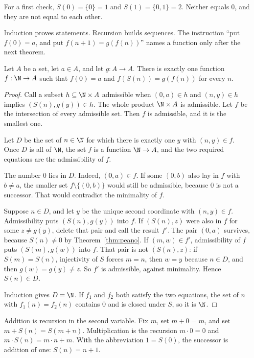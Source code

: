 For a first check, $S(0)=\{0\}=1$ and $S(1)=\{0,1\}=2$. Neither equals $0$, and they are not equal to each other.

Induction proves statements. Recursion builds sequences. The instruction ``put $f(0)=a$, and put $f(n+1)=g(f(n))$'' names a function only after the next theorem.

\begin{theorem}[recursion]\label{thm:recursion}
Let $A$ be a set, let $a\in A$, and let $g:A\to A$. There is exactly one function $f:\N\to A$ such that $f(0)=a$ and $f(S(n))=g(f(n))$ for every $n$.
\end{theorem}
\begin{proof}
Call a subset $h\subseteq\N\times A$ admissible when $(0,a)\in h$ and $(n,y)\in h$ implies $(S(n),g(y))\in h$. The whole product $\N\times A$ is admissible. Let $f$ be the intersection of every admissible set. Then $f$ is admissible, and it is the smallest one.

Let $D$ be the set of $n\in\N$ for which there is exactly one $y$ with $(n,y)\in f$. Once $D$ is all of $\N$, the set $f$ is a function $\N\to A$, and the two required equations are the admissibility of $f$.

The number $0$ lies in $D$. Indeed, $(0,a)\in f$. If some $(0,b)$ also lay in $f$ with $b\ne a$, the smaller set $f\setminus\{(0,b)\}$ would still be admissible, because $0$ is not a successor. That would contradict the minimality of $f$.

Suppose $n\in D$, and let $y$ be the unique second coordinate with $(n,y)\in f$. Admissibility puts $(S(n),g(y))$ into $f$. If $(S(n),z)$ were also in $f$ for some $z\ne g(y)$, delete that pair and call the result $f'$. The pair $(0,a)$ survives, because $S(n)\ne 0$ by Theorem~\ref{thm:peano}. If $(m,w)\in f'$, admissibility of $f$ puts $(S(m),g(w))$ into $f$. That pair is not $(S(n),z)$: if $S(m)=S(n)$, injectivity of $S$ forces $m=n$, then $w=y$ because $n\in D$, and then $g(w)=g(y)\ne z$. So $f'$ is admissible, against minimality. Hence $S(n)\in D$.

Induction gives $D=\N$. If $f_1$ and $f_2$ both satisfy the two equations, the set of $n$ with $f_1(n)=f_2(n)$ contains $0$ and is closed under $S$, so it is $\N$.
\end{proof}

Addition is recursion in the second variable. Fix $m$, set $m+0=m$, and set $m+S(n)=S(m+n)$. Multiplication is the recursion $m\cdot 0=0$ and $m\cdot S(n)=m\cdot n+m$. With the abbreviation $1=S(0)$, the successor is addition of one: $S(n)=n+1$.

